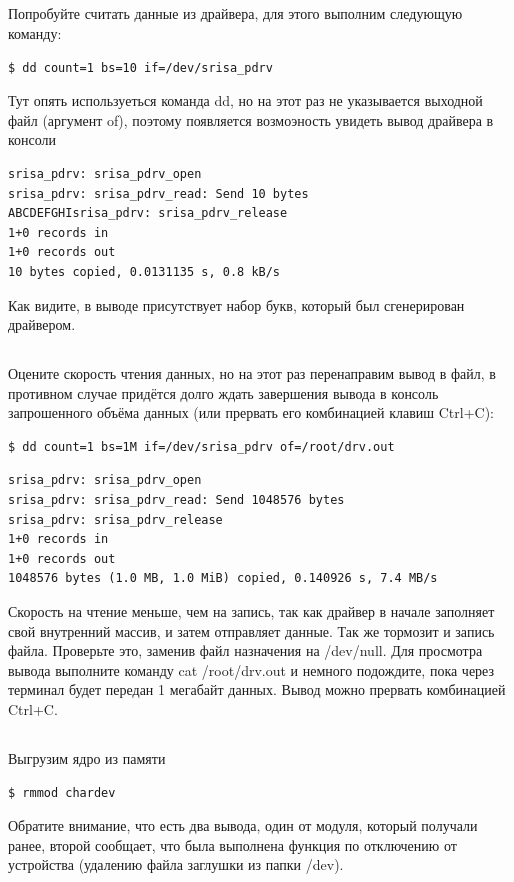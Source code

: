 \subsection{} Попробуйте считать данные из драйвера, для этого выполним следующую команду: 
\begin{lstlisting}[style=bash]
$ dd count=1 bs=10 if=/dev/srisa_pdrv
\end{lstlisting}
Тут опять используеться команда dd, но на этот раз не указывается выходной файл (аргумент of), поэтому появляется возмоэность увидеть вывод драйвера в консоли
\begin{lstlisting}[style=stdout]
srisa_pdrv: srisa_pdrv_open 
srisa_pdrv: srisa_pdrv_read: Send 10 bytes 
ABCDEFGHIsrisa_pdrv: srisa_pdrv_release 
1+0 records in 
1+0 records out 
10 bytes copied, 0.0131135 s, 0.8 kB/s
\end{lstlisting}
Как видите, в выводе присутствует набор букв, который был сгенерирован драйвером.  

\subsection{} Оцените скорость чтения данных, но на этот раз перенаправим вывод в файл, в противном случае придётся долго ждать завершения вывода в консоль запрошенного объёма данных (или прервать его комбинацией клавиш Ctrl+C): 
\begin{lstlisting}[style=bash]
$ dd count=1 bs=1M if=/dev/srisa_pdrv of=/root/drv.out
\end{lstlisting}
\begin{lstlisting}[style=stdout]
srisa_pdrv: srisa_pdrv_open 
srisa_pdrv: srisa_pdrv_read: Send 1048576 bytes 
srisa_pdrv: srisa_pdrv_release 
1+0 records in 
1+0 records out 
1048576 bytes (1.0 MB, 1.0 MiB) copied, 0.140926 s, 7.4 MB/s
\end{lstlisting}
Скорость на чтение меньше, чем на запись, так как драйвер в начале заполняет свой внутренний массив, и затем отправляет данные. Так же тормозит и запись файла. Проверьте это, заменив файл назначения на /dev/null. Для просмотра вывода выполните команду cat /root/drv.out и немного подождите, пока через терминал будет передан 1 мегабайт данных. Вывод можно прервать комбинацией Ctrl+C.

\subsection{}Выгрузим ядро из памяти
\begin{lstlisting}[style=bash]
$ rmmod chardev
\end{lstlisting}
Обратите внимание, что есть два вывода, один от модуля, который получали ранее, второй сообщает, что была выполнена функция по отключению от устройства (удалению файла заглушки из папки /dev).  

